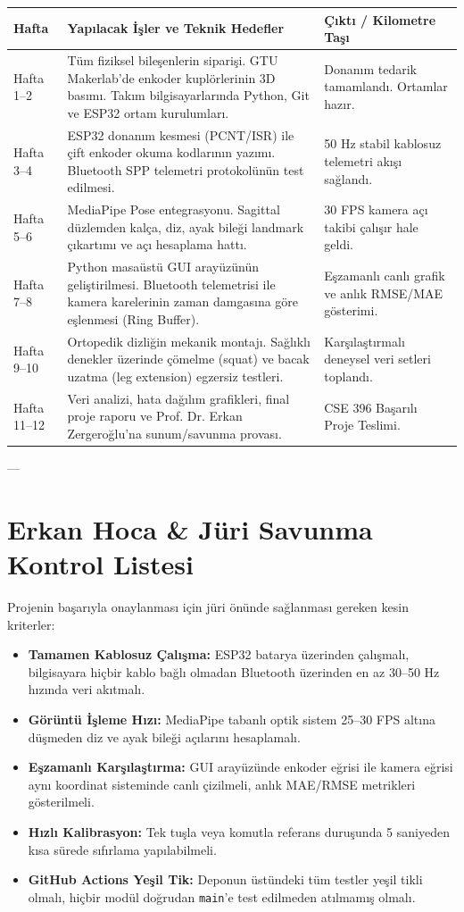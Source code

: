 \documentclass[11pt, a4paper]{article}
\begin{document}
\renewcommand{\arraystretch}{1.2}
\begin{tabularx}{\textwidth}{p{2.2cm} X p{3.5cm}}
\toprule
\rowcolor{lightgray} Hafta & Yapılacak İşler ve Teknik Hedefler & Çıktı / Kilometre Taşı \\
\midrule
Hafta 1--2 & Tüm fiziksel bileşenlerin siparişi. GTU Makerlab'de enkoder kuplörlerinin 3D basımı. Takım bilgisayarlarında Python, Git ve ESP32 ortam kurulumları. & Donanım tedarik tamamlandı. Ortamlar hazır. \\
\midrule
Hafta 3--4 & ESP32 donanım kesmesi (PCNT/ISR) ile çift enkoder okuma kodlarının yazımı. Bluetooth SPP telemetri protokolünün test edilmesi. & 50 Hz stabil kablosuz telemetri akışı sağlandı. \\
\midrule
Hafta 5--6 & MediaPipe Pose entegrasyonu. Sagittal düzlemden kalça, diz, ayak bileği landmark çıkartımı ve açı hesaplama hattı. & 30 FPS kamera açı takibi çalışır hale geldi. \\
\midrule
Hafta 7--8 & Python masaüstü GUI arayüzünün geliştirilmesi. Bluetooth telemetrisi ile kamera karelerinin zaman damgasına göre eşlenmesi (Ring Buffer). & Eşzamanlı canlı grafik ve anlık RMSE/MAE gösterimi. \\
\midrule
Hafta 9--10 & Ortopedik dizliğin mekanik montajı. Sağlıklı denekler üzerinde çömelme (squat) ve bacak uzatma (leg extension) egzersiz testleri. & Karşılaştırmalı deneysel veri setleri toplandı. \\
\midrule
Hafta 11--12 & Veri analizi, hata dağılım grafikleri, final proje raporu ve Prof. Dr. Erkan Zergeroğlu'na sunum/savunma provası. & CSE 396 Başarılı Proje Teslimi. \\
\bottomrule
\end{tabularx}

---

\section{Erkan Hoca \& Jüri Savunma Kontrol Listesi}

Projenin başarıyla onaylanması için jüri önünde sağlanması gereken kesin kriterler:
\begin{itemize}[leftmargin=1.5em, itemsep=0.3em]
    \item[$\square$] \textbf{Tamamen Kablosuz Çalışma:} ESP32 batarya üzerinden çalışmalı, bilgisayara hiçbir kablo bağlı olmadan Bluetooth üzerinden en az 30--50 Hz hızında veri akıtmalı.
    \item[$\square$] \textbf{Görüntü İşleme Hızı:} MediaPipe tabanlı optik sistem 25--30 FPS altına düşmeden diz ve ayak bileği açılarını hesaplamalı.
    \item[$\square$] \textbf{Eşzamanlı Karşılaştırma:} GUI arayüzünde enkoder eğrisi ile kamera eğrisi aynı koordinat sisteminde canlı çizilmeli, anlık MAE/RMSE metrikleri gösterilmeli.
    \item[$\square$] \textbf{Hızlı Kalibrasyon:} Tek tuşla veya komutla referans duruşunda 5 saniyeden kısa sürede sıfırlama yapılabilmeli.
    \item[$\square$] \textbf{GitHub Actions Yeşil Tik:} Deponun üstündeki tüm testler yeşil tikli olmalı, hiçbir modül doğrudan \texttt{main}'e test edilmeden atılmamış olmalı.
\end{itemize}
\end{document}
